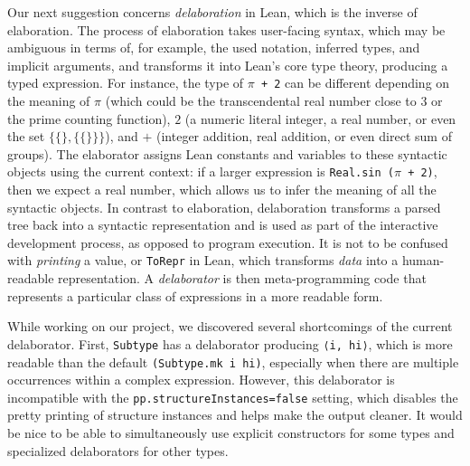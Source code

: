 Our next suggestion concerns \emph{delaboration} in Lean, which is the inverse of elaboration. The process of elaboration takes user-facing syntax, which may be ambiguous in terms of, for example, the used notation, inferred types, and implicit arguments, and transforms it into Lean's core type theory, producing a typed expression. For instance, the type of \texttt{$\pi$ + 2} can be different depending on the meaning of $\pi$ (which could be the transcendental real number close to 3 or the prime counting function), $2$ (a numeric literal integer, a real number, or even the set $\{\{\},\{\{\}\}\}$), and $+$ (integer addition, real addition, or even direct sum of groups). The elaborator assigns Lean constants and variables to these syntactic objects using the current context: if a larger expression is \texttt{Real.sin ($\pi$ + 2)}, then we expect a real number, which allows us to infer the meaning of all the syntactic objects. In contrast to elaboration, delaboration transforms a parsed tree back into a syntactic representation and is used as part of the interactive development process, as opposed to program execution. It is not to be confused with \emph{printing} a value, or \texttt{ToRepr} in Lean, which transforms \emph{data} into a human-readable representation. A \emph{delaborator} is then meta-programming code that represents a particular class of expressions in a more readable form.

While working on our project, we %
discovered several shortcomings of the current delaborator. First, \texttt{Subtype} has a delaborator producing \texttt{⟨i, hi⟩}, which is more readable than the default \texttt{(Subtype.mk i hi)}, especially when there are multiple occurrences within a complex expression. However, this delaborator is incompatible with the \texttt{pp.structureInstances=false} setting, which disables the pretty printing of structure instances and helps make the output cleaner. It would be nice to be able to simultaneously use explicit constructors for some types and specialized delaborators for other types.

